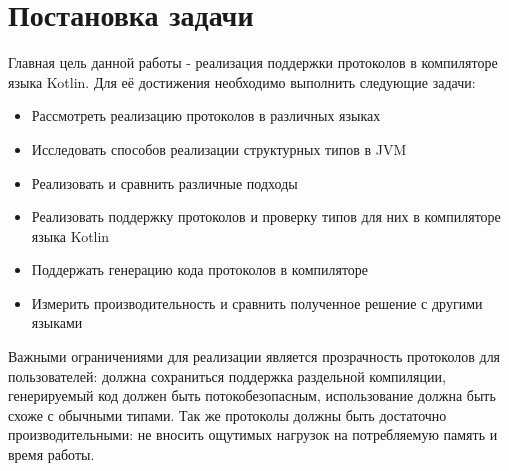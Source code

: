 \section*{Постановка задачи}
Главная цель данной работы - реализация поддержки протоколов в компиляторе языка Kotlin. Для её достижения необходимо выполнить следующие задачи:
\begin{itemize}
    \item Рассмотреть реализацию протоколов в различных языках
    \item Исследовать способов реализации структурных типов в JVM
    \item Реализовать и сравнить различные подходы
    \item Реализовать поддержку протоколов и проверку типов для них в компиляторе языка Kotlin
    \item Поддержать генерацию кода протоколов в компиляторе
    \item Измерить производительность и сравнить полученное решение с другими языками
\end{itemize}

Важными ограничениями для реализации является прозрачность протоколов для пользователей: должна сохраниться поддержка раздельной компиляции, генерируемый код должен быть потокобезопасным, использование должна быть схоже с обычными типами. Так же протоколы должны быть достаточно производительными: не вносить ощутимых нагрузок на потребляемую память и время работы.